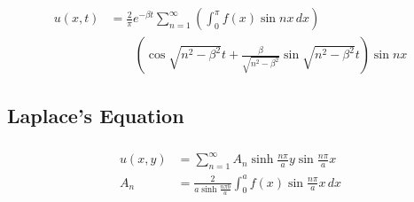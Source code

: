 \documentclass{article}
\begin{document}
\begin{align*}
  u(x, t) & = \frac{2}{\pi} e^{-\beta t} \sum_{n = 1}^\infty \left( \int_0^\pi f(x) \sin n x \,d x \right)                              \\
          & \qquad \left( \cos \sqrt{n^2 - \beta^2} t + \frac{\beta}{\sqrt{n^2 - \beta^2}} \sin \sqrt{n^2 - \beta^2} t \right) \sin n x
\end{align*}

\subsection{Laplace's Equation}

\subsubsection{}

\begin{align*}
  u(x, y) & = \sum_{n = 1}^\infty A_n \sinh \frac{n \pi}{a} y \sin \frac{n \pi}{a} x         \\
  A_n     & = \frac{2}{a \sinh \frac{n \pi b}{a}} \int_0^a f(x) \sin \frac{n \pi}{a} x \,d x
\end{align*}

\setcounter{subsubsection}{4}
\subsubsection{}
\end{document}
